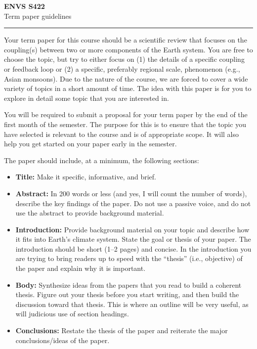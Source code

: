 \documentclass[11pt,letterpaper]{article}
\begin{document}
\setlength{\parindent}{0in}
\newcommand{\tablespace}[0]{\vspace{8pt}}
\textbf{ENVS S422}\\
Term paper guidelines\\

\hrule
Your term paper for this course should be a scientific review that focuses on the coupling(s) between two or more components of the Earth system. You are free to choose the topic, but try to either focus on (1) the details of a specific coupling or feedback loop or (2) a specific, preferably regional scale, phenomenon (e.g., Asian monsoons). Due to the nature of the course, we are forced to cover a wide variety of topics in a short amount of time. The idea with this paper is for you to explore in detail some topic that you are interested in.

You will be required to submit a proposal for your term paper by the end of the first month of the semester. The purpose for this is to ensure that the topic you have selected is relevant to the course and is of appropriate scope. It will also help you get started on your paper early in the semester.

The paper should include, at a minimum, the following sections:

\begin{itemize}\itemsep -5pt
\item {\bf Title:} Make it specific, informative, and brief.
\item {\bf Abstract:} In 200 words or less (and yes, I will count the number of words), describe the key findings of the paper. Do not use a passive voice, and do not use the abstract to provide background material.
\item {\bf Introduction:} Provide background material on your topic and describe how it fits into Earth's climate system. State the goal or thesis of your paper. The introduction should be short (1--2 pages) and concise. In the introduction you are trying to bring readers up to speed with the ``thesis'' (i.e., objective) of the paper and explain why it is important. 
\item {\bf Body:} Synthesize ideas from the papers that you read to build a coherent thesis. Figure out your thesis before you start writing, and then build the discussion toward that thesis. This is where an outline will be very useful, as will judicious use of section headings.
\item {\bf Conclusions:} Restate the thesis of the paper and reiterate the major conclusions/ideas of the paper.
\end{itemize}
\end{document}
